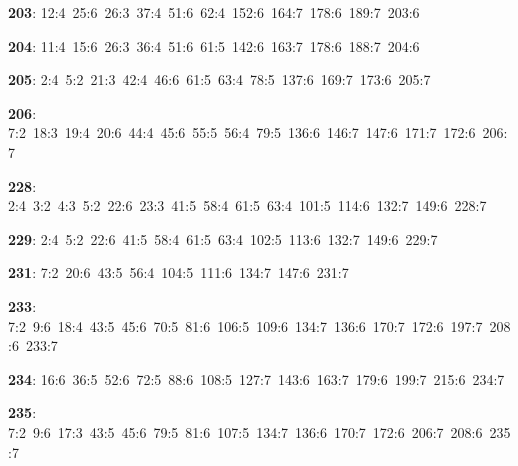 \noindent \textbf{203}: 12:4\allowbreak\ 25:6\allowbreak\ 26:3\allowbreak\ 37:4\allowbreak\ 51:6\allowbreak\ 62:4\allowbreak\ 152:6\allowbreak\ 164:7\allowbreak\ 178:6\allowbreak\ 189:7\allowbreak\ 203:6\par
\noindent \textbf{204}: 11:4\allowbreak\ 15:6\allowbreak\ 26:3\allowbreak\ 36:4\allowbreak\ 51:6\allowbreak\ 61:5\allowbreak\ 142:6\allowbreak\ 163:7\allowbreak\ 178:6\allowbreak\ 188:7\allowbreak\ 204:6\par
\noindent \textbf{205}: 2:4\allowbreak\ 5:2\allowbreak\ 21:3\allowbreak\ 42:4\allowbreak\ 46:6\allowbreak\ 61:5\allowbreak\ 63:4\allowbreak\ 78:5\allowbreak\ 137:6\allowbreak\ 169:7\allowbreak\ 173:6\allowbreak\ 205:7\par
\noindent \textbf{206}: 7:2\allowbreak\ 18:3\allowbreak\ 19:4\allowbreak\ 20:6\allowbreak\ 44:4\allowbreak\ 45:6\allowbreak\ 55:5\allowbreak\ 56:4\allowbreak\ 79:5\allowbreak\ 136:6\allowbreak\ 146:7\allowbreak\ 147:6\allowbreak\ 171:7\allowbreak\ 172:6\allowbreak\ 206:7\par
\noindent \textbf{228}: 2:4\allowbreak\ 3:2\allowbreak\ 4:3\allowbreak\ 5:2\allowbreak\ 22:6\allowbreak\ 23:3\allowbreak\ 41:5\allowbreak\ 58:4\allowbreak\ 61:5\allowbreak\ 63:4\allowbreak\ 101:5\allowbreak\ 114:6\allowbreak\ 132:7\allowbreak\ 149:6\allowbreak\ 228:7\par
\noindent \textbf{229}: 2:4\allowbreak\ 5:2\allowbreak\ 22:6\allowbreak\ 41:5\allowbreak\ 58:4\allowbreak\ 61:5\allowbreak\ 63:4\allowbreak\ 102:5\allowbreak\ 113:6\allowbreak\ 132:7\allowbreak\ 149:6\allowbreak\ 229:7\par
\noindent \textbf{231}: 7:2\allowbreak\ 20:6\allowbreak\ 43:5\allowbreak\ 56:4\allowbreak\ 104:5\allowbreak\ 111:6\allowbreak\ 134:7\allowbreak\ 147:6\allowbreak\ 231:7\par
\noindent \textbf{233}: 7:2\allowbreak\ 9:6\allowbreak\ 18:4\allowbreak\ 43:5\allowbreak\ 45:6\allowbreak\ 70:5\allowbreak\ 81:6\allowbreak\ 106:5\allowbreak\ 109:6\allowbreak\ 134:7\allowbreak\ 136:6\allowbreak\ 170:7\allowbreak\ 172:6\allowbreak\ 197:7\allowbreak\ 208:6\allowbreak\ 233:7\par
\noindent \textbf{234}: 16:6\allowbreak\ 36:5\allowbreak\ 52:6\allowbreak\ 72:5\allowbreak\ 88:6\allowbreak\ 108:5\allowbreak\ 127:7\allowbreak\ 143:6\allowbreak\ 163:7\allowbreak\ 179:6\allowbreak\ 199:7\allowbreak\ 215:6\allowbreak\ 234:7\par
\noindent \textbf{235}: 7:2\allowbreak\ 9:6\allowbreak\ 17:3\allowbreak\ 43:5\allowbreak\ 45:6\allowbreak\ 79:5\allowbreak\ 81:6\allowbreak\ 107:5\allowbreak\ 134:7\allowbreak\ 136:6\allowbreak\ 170:7\allowbreak\ 172:6\allowbreak\ 206:7\allowbreak\ 208:6\allowbreak\ 235:7\par
